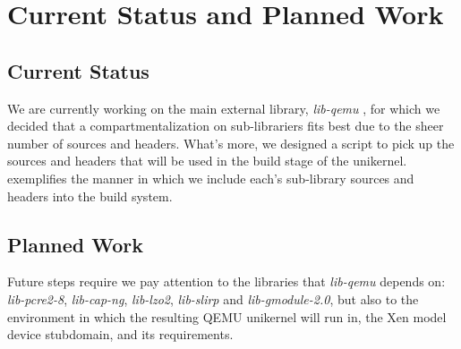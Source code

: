 \chapter{Current Status and Planned Work}
\label{chapter:status-planned-work}

\section{Current Status}
\label{sec:current-status}

We are currently working on the main external library, \textit{lib-qemu} \cite{lib-qemu}, for which we decided that a compartmentalization on sub-librariers fits best due to the sheer number of sources and headers.
What's more, we designed a script to pick up the sources and headers that will be used in the build stage of the unikernel.
 exemplifies the manner in which we include each's sub-library sources and headers into the build system.

\section{Planned Work}
\label{sec:planned work}

Future steps require we pay attention to the libraries that \textit{lib-qemu} depends on: \textit{lib-pcre2-8}, \textit{lib-cap-ng}, \textit{lib-lzo2}, \textit{lib-slirp} and \textit{lib-gmodule-2.0}, but also to the environment in which the resulting QEMU unikernel will run in, the Xen model device stubdomain, and its requirements.
